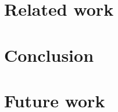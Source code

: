 \documentclass[print]{uit-thesis}
\begin{document}
\chapter{Related work}


\chapter{Conclusion}


\chapter{Future work}


\printbibliography

% 

\backmatter
\end{document}
